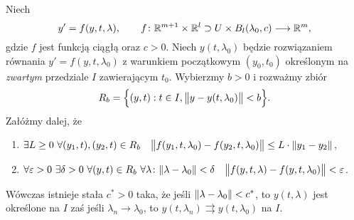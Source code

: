\begin{theorem}
  Niech
  \[
    y' = f(y,t,\lambda), \qquad
    f \colon \R^{m + 1} \times \R^l \supset U \times B_l(\lambda_0,c) \longrightarrow \R^m,
  \]
  gdzie $f$ jest funkcją ciągłą oraz $c > 0$. Niech $y(t,\lambda_0)$ będzie rozwiązaniem równania
  $y' = f(y,t,\lambda_0)$ z warunkiem początkowym $(y_0, t_0)$ określonym na \emph{zwartym}
  przedziale $I$ zawierającym $t_0$. Wybierzmy $b > 0$ i rozważmy zbiór 
  \[
    R_b = \Big\{ (y,t) : t \in I, \norm[\big]{ y - y(t,\lambda_0) } < b \Big\}.
  \]
  Załóżmy dalej, że
  \begin{enumerate}
    \item $\exists L \geq 0 \ \forall (y_1,t),(y_2,t) \in R_b \quad
    \norm[\big]{ f(y_1,t,\lambda_0) - f(y_2,t,\lambda_0) } \leq L \cdot \norm{y_1 - y_2}$,
    \item $\forall \varepsilon > 0 \ \exists \delta > 0 \ \forall (y,t) \in R_b
    \ \forall \lambda \colon \norm{\lambda - \lambda_0} < \delta \quad \norm[\big]{ f(y,t,\lambda) 
    - f(y,t,\lambda_0) } < \varepsilon$.
  \end{enumerate}
  Wówczas istnieje stała $c^{\ast} > 0$ taka, że jeśli $\norm{\lambda - \lambda_0} < c^{\ast}$, to
  $y(t,\lambda)$ jest określone na $I$ zaś jeśli $\lambda_n \to \lambda_0$, to $y(t,\lambda_n)
  \rightrightarrows y(t,\lambda_0)$ na $I$.
\end{theorem}